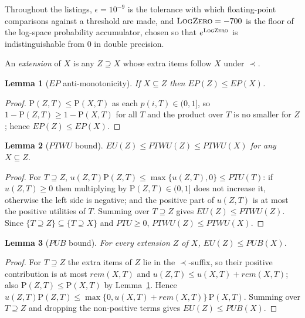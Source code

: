 \documentclass[pdflatex,sn-vancouver-num]{sn-jnl}
\theoremstyle{thmstyleone}%
\newtheorem{lemma}{Lemma}%
\theoremstyle{thmstyletwo}%
\theoremstyle{thmstylethree}%
\newcommand{\prob}{p}
\newcommand{\uu}{u}
\newcommand{\EU}{\mathit{EU}}
\newcommand{\EP}{\mathit{EP}}
\newcommand{\PTU}{\mathit{PTU}}
\newcommand{\PTWU}{\mathit{PTWU}}
\newcommand{\PUB}{\mathit{PUB}}
\newcommand{\rem}{\mathit{rem}}
\newcommand{\itemset}{X}
\begin{document}
Throughout the listings, $\epsilon=10^{-9}$ is the tolerance with which
floating-point comparisons against a threshold are made, and
$\textsc{LogZero}=-700$ is the floor of the log-space probability
accumulator, chosen so that $e^{\textsc{LogZero}}$ is indistinguishable
from $0$ in double precision.

An \emph{extension} of $\itemset$ is any $Z\supseteq \itemset$ whose extra items
follow $\itemset$ under $\prec$.

\begin{lemma}[$\EP$ anti-monotonicity]\label{lem:ep}
If $\itemset\subseteq Z$ then $\EP(Z)\le\EP(\itemset)$.
\end{lemma}
\begin{proof}
$\mathrm{P}(Z,T)\le\mathrm{P}(\itemset,T)$ as each $\prob(i,T)\in(0,1]$, so
$1-\mathrm{P}(Z,T)\ge1-\mathrm{P}(\itemset,T)$ for all $T$ and the product over
$T$ is no smaller for $Z$; hence $\EP(Z)\le\EP(\itemset)$.
\end{proof}

\begin{lemma}[$\PTWU$ bound]\label{lem:ptwu}
$\EU(Z)\le\PTWU(Z)\le\PTWU(\itemset)$ for any $\itemset\subseteq Z$.
\end{lemma}
\begin{proof}
For $T\supseteq Z$, $\uu(Z,T)\mathrm{P}(Z,T)\le\max\{\uu(Z,T),0\}\le\PTU(T)$:
if $\uu(Z,T)\ge0$ then multiplying by $\mathrm{P}(Z,T)\in(0,1]$ does not increase
it, otherwise the left side is negative; and the positive part of $\uu(Z,T)$ is
at most the positive utilities of $T$. Summing over $T\supseteq Z$ gives
$\EU(Z)\le\PTWU(Z)$. Since $\{T\supseteq Z\}\subseteq\{T\supseteq \itemset\}$ and
$\PTU\ge0$, $\PTWU(Z)\le\PTWU(\itemset)$.
\end{proof}

\begin{lemma}[$\PUB$ bound]\label{lem:pub}
For every extension $Z$ of $\itemset$, $\EU(Z)\le\PUB(\itemset)$.
\end{lemma}
\begin{proof}
For $T\supseteq Z$ the extra items of $Z$ lie in the $\prec$-suffix, so their
positive contribution is at most $\rem(\itemset,T)$ and
$\uu(Z,T)\le\uu(\itemset,T)+\rem(\itemset,T)$; also
$\mathrm{P}(Z,T)\le\mathrm{P}(\itemset,T)$ by Lemma~\ref{lem:ep}. Hence
$\uu(Z,T)\mathrm{P}(Z,T)\le\max\{0,\uu(\itemset,T)+\rem(\itemset,T)\}\,\mathrm{P}(\itemset,T)$.
Summing over $T\supseteq Z$ and dropping the non-positive terms gives
$\EU(Z)\le\PUB(\itemset)$.
\end{proof}
\end{document}
